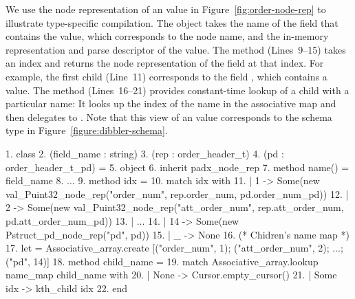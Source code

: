 We use the node representation of an 
value in Figure~\ref{fig:order-node-rep} to illustrate type-specific
compilation.  The object takes the name of the field that contains the
 value, which corresponds to the \Xml{} node
name, and the in-memory representation and parse descriptor of the
value.  The  method (Lines~9--15) takes an index and
returns the node representation of the field at that index.  For
example, the first child (Line~11) corresponds to the field
, which contains a  value.  The
 method (Lines~16--21) provides constant-time
lookup of a child with a particular name: It looks up the index of the
name in the associative map  and then delegates
to .  Note that this \Xml{} view of an
 value corresponds to the schema type
 in Figure~\ref{figure:dibbler-schema}.
\begin{figure*}
\begin{small}
\begin{code}
{ 1}. class 
{ 2}.       (field\_name : string)
{ 3}.       (rep : order\_header\_t)
{ 4}.       (pd  : order\_header\_t\_pd) = 
{ 5}. object 
{ 6}.   inherit padx\_node\_rep
{ 7}.   method name() = field\_name
{ 8}.   ... 
{ 9}.   method  idx = 
{10}.     match idx with 
{11}.     |  1 -> Some(new val\_Puint32\_node\_rep("order\_num", rep.order\_num, pd.order\_num\_pd))
{12}.     |  2 -> Some(new val\_Puint32\_node\_rep("att\_order\_num", rep.att\_order\_num, pd.att\_order\_num\_pd))
{13}.     | ...
{14}.     | 14 -> Some(new Pstruct\_pd\_node\_rep("pd", pd))
{15}.     | _  -> None
\mbox{}
{16}.   (* Chidren's name map *)
{17}.   let  = Associative\_array.create [("order\_num", 1); ("att\_order\_num", 2); ...; ("pd", 14)] 
{18}.   method  child\_name =
{19}.     match Associative\_array.lookup name\_map child\_name with
{20}.     | None -> Cursor.empty_cursor()
{21}.     | Some idx -> kth_child idx 
{22}. end
\end{code}
\end{small}
\caption{Fragment of compiler-generated node representation for \texttt{order\_header\_t}}
\label{fig:order-node-rep}
\end{figure*}


